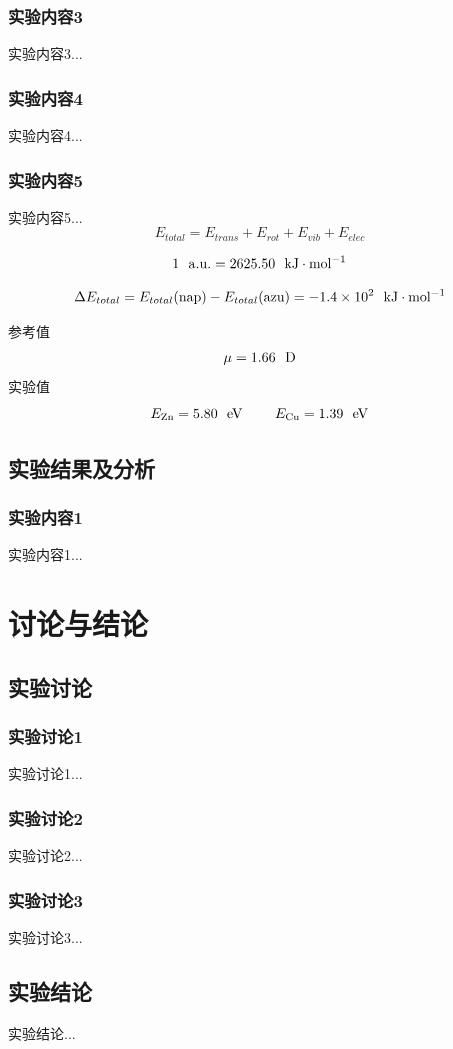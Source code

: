 \documentclass[12pt]{article}
\begin{document}
	 		\subsubsection{实验内容3}
	 			实验内容3...
	 		\subsubsection{实验内容4}
	 			实验内容4...
	 		\subsubsection{实验内容5}
	 			实验内容5...
	 			$$ E_{total}=E_{trans}+E_{rot}+E_{vib}+E_{elec} $$ 
	 	
	 			$$ 1\ \ {\rm a.u.}=2625.50 \ \ {\rm kJ \cdot mol^{-1}} $$
	 			
	 			$$\Delta E_{total}=E_{total}({\rm nap})-E_{total}{\rm (azu)=-1.4\times10^{2} \ \ kJ \cdot mol^{-1} }$$
	 	
	 			参考值\citealp{dean1992lange} 
	 			$$\mu=1.66\ \ {\rm D}$$
	 			实验值\citealp{Bast2009,Konecny2019}
	 			$$E_{\rm Zn}=5.80 \ \ {\rm eV}\ \ \ \ \ \ \ E_{\rm Cu}=1.39\ \ {\rm eV}$$
	 		
	 	\subsection{实验结果及分析}
			\subsubsection{实验内容1}
	 			实验内容1...
 			
	\vbox{} 
 	
 	\section{讨论与结论}
		\subsection{实验讨论}
 			\subsubsection{实验讨论1}
 	 			实验讨论1...
 	 		\subsubsection{实验讨论2}
 	 			实验讨论2...
 	 		\subsubsection{实验讨论3}
 	 			实验讨论3...
 	 
 		 \subsection{实验结论}
 	 		实验结论...

\vbox{}  


\end{document}
